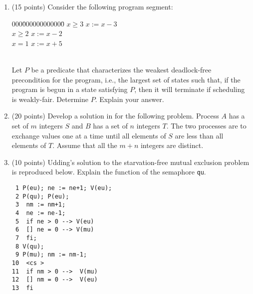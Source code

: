 \begin{enumerate}
\begin{enumerate}
\end{enumerate}


\item (15 points)
Consider the following program segment:

\begin{tabbing}
000\=000000000000\=\kill
\co\> \lb \await $x \geq 3$ \>\ra $x := x - 3$ \rb\\
\pa\> \lb \await $x \geq 2$ \>\ra $x := x - 2$ \rb\\
\pa\> \lb \await $x = 1$ \>\ra $x := x + 5$ \rb\\
\oc\\
\end{tabbing}

Let $P$ be a predicate that characterizes the weakest deadlock-free
precondition for the program, i.e., the largest set of states such
that, if the program is begun in a state satisfying $P$, then it will
terminate if scheduling is weakly-fair.  Determine $P$.  Explain your
answer.


\item (20 points)
Develop a solution in \CSP for the following problem.  Process $A$ has
a set of $m$ integers $S$ and $B$ has a set of $n$ integers $T$.  The
two processes are to exchange values one at a time until all elements
of $S$ are less than all elements of $T$.  Assume that all the $m+n$
integers are distinct.



\item (10 points) Udding's solution to the starvation-free mutual
exclusion problem is reproduced below.  Explain the function of the
semaphore {\tt qu}.

\begin{verbatim}
 1 P(eu); ne := ne+1; V(eu);
 2 P(qu); P(eu);	    
 3	nm := nm+1;	    
 4	ne := ne-1;	    
 5	if ne > 0 --> V(eu) 
 6	[] ne = 0 --> V(mu) 
 7	fi;		    
 8 V(qu);		    
 9 P(mu); nm := nm-1;	    
10	<cs >		    
11	if nm > 0 -->  V(mu)
12	[] nm = 0 -->  V(eu)
13	fi		    
\end{verbatim}




\end{enumerate}

